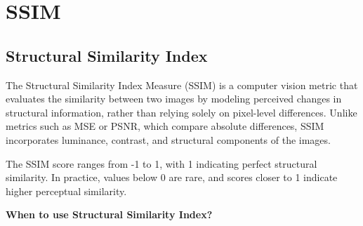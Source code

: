 
\clearpage
\thispagestyle{cvstyle}
\section{SSIM}
\subsection{Structural Similarity Index}

The Structural Similarity Index Measure (SSIM) is a computer vision metric that evaluates the similarity
between two images by modeling perceived changes in structural information, rather than relying solely on
pixel-level differences. Unlike metrics such as MSE or PSNR, which compare absolute differences, SSIM
incorporates luminance, contrast, and structural components of the images.

\begin{center}
\end{center}

The SSIM score ranges from -1 to 1, with 1 indicating perfect structural similarity. In practice, values
below 0 are rare, and scores closer to 1 indicate higher perceptual similarity.

\textbf{When to use Structural Similarity Index?}

